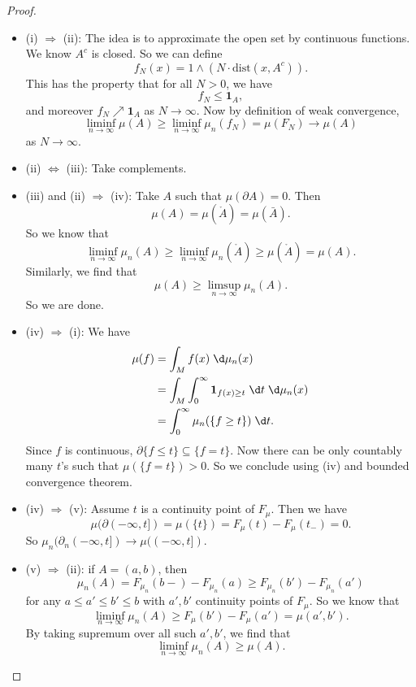 \documentclass[a4paper]{article}
\begin{document}
\begin{proof}\leavevmode
  \begin{itemize}
    \item (i) $\Rightarrow$ (ii): The idea is to approximate the open set by continuous functions. We know $A^c$ is closed. So we can define
      \[
        f_N(x) = 1 \wedge (N \cdot \mathrm{dist}(x, A^c)).
      \]
      This has the property that for all $N > 0$, we have
      \[
        f_N \leq \mathbf{1}_A,
      \]
      and moreover $f_N \nearrow \mathbf{1}_A$ as $N \to \infty$. Now by definition of weak convergence,
      \[
        \liminf_{n \to \infty} \mu(A)\geq \liminf_{n \to \infty} \mu_n(f_N) = \mu(F_N) \to \mu(A)
      \]
      as $N \to \infty$.
    \item (ii) $\Leftrightarrow$ (iii): Take complements.
    \item (iii) and (ii) $\Rightarrow$ (iv): Take $A$ such that $\mu(\partial A) = 0$. Then
      \[
        \mu(A) = \mu(\mathring{A}) = \mu(\bar{A}).
      \]
      So we know that
      \[
        \liminf_{n \to \infty} \mu_n(A) \geq \liminf_{n \to \infty} \mu_n(\mathring{A}) \geq \mu(\mathring{A}) = \mu(A).
      \]
      Similarly, we find that
      \[
        \mu(A) \geq \limsup_{n \to \infty} \mu_n(A).
      \]
      So we are done.
    \item (iv) $\Rightarrow$ (i): We have
      \begin{align*}
        \mu(f) &= \int_M f(x) \;\d \mu_n(x)\\
        &= \int_M \int_0^\infty \mathbf{1}_{f(x) \geq t}\;\d t \;\d \mu_n(x)\\
        &= \int_0^\infty \mu_n(\{f \geq t\})\;\d t.
      \end{align*}
      Since $f$ is continuous, $\partial \{f \leq t\} \subseteq \{f = t\}$. Now there can be only countably many $t$'s such that $\mu(\{f = t\}) > 0$. So we conclude using (iv) and bounded convergence theorem. %

    \item (iv) $\Rightarrow$ (v): Assume $t$ is a continuity point of $F_\mu$. Then we have
      \[
        \mu(\partial(-\infty, t]) = \mu(\{t\}) = F_\mu(t) - F_\mu(t_-) = 0.
      \]
      So $\mu_n(\partial_n(-\infty, t]) \to \mu((-\infty, t])$.
    \item (v) $\Rightarrow$ (ii): if $A = (a, b)$, then
      \[
        \mu_n(A) = F_{\mu_n}(b-) - F_{\mu_n}(a) \geq F_{\mu_n} (b') - F_{\mu_n}(a')
      \]
      for any $a \leq a' \leq b' \leq b$ with $a', b'$ continuity points of $F_\mu$. So we know that
      \[
        \liminf_{n \to \infty} \mu_n(A) \geq F_\mu(b') - F_\mu(a') = \mu(a', b').
      \]
      By taking supremum over all such $a', b'$, we find that
      \[
        \liminf_{n \to \infty} \mu_n(A) \geq \mu(A).
      \]
  \end{itemize}
\end{proof}
\end{document}
